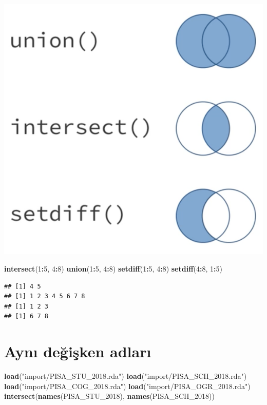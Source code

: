 \documentclass[
  oneside]{book}
\newenvironment{Shaded}{\begin{snugshade}}{\end{snugshade}}
\newcommand{\DecValTok}[1]{\textcolor[rgb]{0.00,0.00,0.81}{#1}}
\newcommand{\FunctionTok}[1]{\textcolor[rgb]{0.13,0.29,0.53}{\textbf{#1}}}
\newcommand{\NormalTok}[1]{#1}
\newcommand{\SpecialCharTok}[1]{\textcolor[rgb]{0.81,0.36,0.00}{\textbf{#1}}}
\newcommand{\StringTok}[1]{\textcolor[rgb]{0.31,0.60,0.02}{#1}}
\begin{document}
\begin{center}\includegraphics[width=0.7\linewidth]{images/kumeislemleri} \end{center}

\begin{Shaded}
\begin{Highlighting}[]
\FunctionTok{intersect}\NormalTok{(}\DecValTok{1}\SpecialCharTok{:}\DecValTok{5}\NormalTok{, }\DecValTok{4}\SpecialCharTok{:}\DecValTok{8}\NormalTok{)}
\FunctionTok{union}\NormalTok{(}\DecValTok{1}\SpecialCharTok{:}\DecValTok{5}\NormalTok{, }\DecValTok{4}\SpecialCharTok{:}\DecValTok{8}\NormalTok{)}
\FunctionTok{setdiff}\NormalTok{(}\DecValTok{1}\SpecialCharTok{:}\DecValTok{5}\NormalTok{, }\DecValTok{4}\SpecialCharTok{:}\DecValTok{8}\NormalTok{)}
\FunctionTok{setdiff}\NormalTok{(}\DecValTok{4}\SpecialCharTok{:}\DecValTok{8}\NormalTok{, }\DecValTok{1}\SpecialCharTok{:}\DecValTok{5}\NormalTok{)}
\end{Highlighting}
\end{Shaded}

\begin{verbatim}
## [1] 4 5
## [1] 1 2 3 4 5 6 7 8
## [1] 1 2 3
## [1] 6 7 8
\end{verbatim}

\hypertarget{aynux131-deux11fiux15fken-adlarux131}{%
\section{Aynı değişken adları}\label{aynux131-deux11fiux15fken-adlarux131}}

\begin{Shaded}
\begin{Highlighting}[]
\FunctionTok{load}\NormalTok{(}\StringTok{"import/PISA\_STU\_2018.rda"}\NormalTok{)}
\FunctionTok{load}\NormalTok{(}\StringTok{"import/PISA\_SCH\_2018.rda"}\NormalTok{)}
\FunctionTok{load}\NormalTok{(}\StringTok{"import/PISA\_COG\_2018.rda"}\NormalTok{)}
\FunctionTok{load}\NormalTok{(}\StringTok{"import/PISA\_OGR\_2018.rda"}\NormalTok{)}
\FunctionTok{intersect}\NormalTok{(}\FunctionTok{names}\NormalTok{(PISA\_STU\_2018), }\FunctionTok{names}\NormalTok{(PISA\_SCH\_2018))}
\end{Highlighting}
\end{Shaded}
\end{document}
